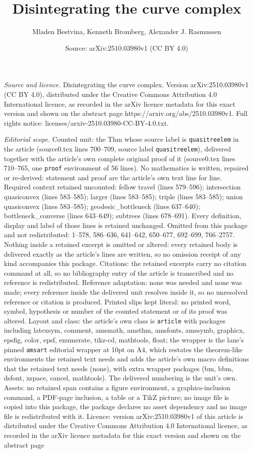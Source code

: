 \documentclass[10pt,a4paper]{amsart}
\title[Disintegrating the curve complex]{Disintegrating the curve complex}
\author{Mladen Bestvina, Kenneth Bromberg, Alexander J. Rasmussen}
\date{Source: arXiv:2510.03980v1 (CC BY 4.0)}
\begin{document}
\maketitle

\noindent\emph{Source and licence.} Disintegrating the curve complex. Version arXiv:2510.03980v1 (CC BY 4.0), distributed under the Creative Commons Attribution 4.0 International licence, as recorded in the arXiv licence metadata for this exact version and shown on the abstract page https://arxiv.org/abs/2510.03980v1. Full rights notice: licenses/arxiv-2510.03980-CC-BY-4.0.txt.\par\smallskip

\noindent\textit{Editorial scope.} Counted unit: the Thm whose source label is \texttt{quasitreelem} in the article (source0.tex lines 700--709, source label \texttt{quasitreelem}), delivered together with the article's own complete original proof of it (source0.tex lines 710--765, one \texttt{proof} environment of 56 lines). No mathematics is written, repaired or re-derived: statement and proof are the article's own text line for line. Required context retained uncounted: fellow travel (lines 579--596); intersection quasiconvex (lines 583--585); larger (lines 583--585); triple (lines 583--585); union quasiconvex (lines 583--585); geodesic\_bottleneck (lines 637--640); bottleneck\_converse (lines 643--649); subtrees (lines 678--691). Every definition, display and label of those lines is retained unchanged. Omitted from this package and not redistributed: 1--578, 586--636, 641--642, 650--677, 692--699, 766--2757. Nothing inside a retained excerpt is omitted or altered: every retained body is delivered exactly as the article's lines are written, so no omission receipt of any kind accompanies this package. Citations: the retained excerpts carry no citation command at all, so no bibliography entry of the article is transcribed and no reference is redistributed. Reference adaptation: none was needed and none was made; every reference inside the delivered unit resolves inside it, so no unresolved reference or citation is produced. Printed slips kept literal: no printed word, symbol, hypothesis or number of the counted statement or of its proof was altered. Layout and class: the article's own class is \texttt{article} with packages including latexsym, comment, amsmath, amsthm, amsfonts, amssymb, graphicx, epsfig, color, epsf, enumerate, tikz-cd, mathtools, float; the wrapper is the lane's pinned \texttt{amsart} editorial wrapper at 10pt on A4, which restates the theorem-like environments the retained text needs and adds the article's own macro definitions that the retained text needs (none), with extra wrapper packages (bm, bbm, dsfont, xspace, cancel, mathtools). The delivered numbering is the unit's own. Assets: no retained span contains a figure environment, a graphics-inclusion command, a PDF-page inclusion, a table or a TikZ picture; no image file is copied into this package, the package declares no asset dependency and no image file is redistributed with it. Licence: version arXiv:2510.03980v1 of this article is distributed under the Creative Commons Attribution 4.0 International licence, as recorded in the arXiv licence metadata for this exact version and shown on the abstract page 
\end{document}
